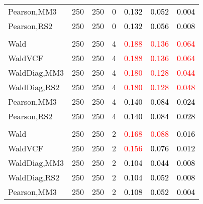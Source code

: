 \documentclass[
]{article}
\begin{document}
\begin{table}[H]
{\begin{tabular}[t]{lrrrrrr}
\hspace{1em}Pearson,MM3 & 250 & 250 & 0 & \textcolor{black}{0.132} & \textcolor{black}{0.052} & \textcolor{black}{0.004}\\
\hspace{1em}Pearson,RS2 & 250 & 250 & 0 & \textcolor{black}{0.132} & \textcolor{black}{0.056} & \textcolor{black}{0.008}\\
\addlinespace[0.3em]
\multicolumn{7}{l}{\textbf{1F 15V}}\\
\hspace{1em}Wald & 250 & 250 & 4 & \textcolor{red}{0.188} & \textcolor{red}{0.136} & \textcolor{red}{0.064}\\
\hspace{1em}WaldVCF & 250 & 250 & 4 & \textcolor{red}{0.188} & \textcolor{red}{0.136} & \textcolor{red}{0.064}\\
\hspace{1em}WaldDiag,MM3 & 250 & 250 & 4 & \textcolor{red}{0.180} & \textcolor{red}{0.128} & \textcolor{red}{0.044}\\
\hspace{1em}WaldDiag,RS2 & 250 & 250 & 4 & \textcolor{red}{0.180} & \textcolor{red}{0.128} & \textcolor{red}{0.048}\\
\hspace{1em}Pearson,MM3 & 250 & 250 & 4 & \textcolor{black}{0.140} & \textcolor{black}{0.084} & \textcolor{black}{0.024}\\
\hspace{1em}Pearson,RS2 & 250 & 250 & 4 & \textcolor{black}{0.140} & \textcolor{black}{0.084} & \textcolor{black}{0.028}\\
\addlinespace[0.3em]
\multicolumn{7}{l}{\textbf{2F 10V}}\\
\hspace{1em}Wald & 250 & 250 & 2 & \textcolor{red}{0.168} & \textcolor{red}{0.088} & \textcolor{black}{0.016}\\
\hspace{1em}WaldVCF & 250 & 250 & 2 & \textcolor{red}{0.156} & \textcolor{black}{0.076} & \textcolor{black}{0.012}\\
\hspace{1em}WaldDiag,MM3 & 250 & 250 & 2 & \textcolor{black}{0.104} & \textcolor{black}{0.044} & \textcolor{black}{0.008}\\
\hspace{1em}WaldDiag,RS2 & 250 & 250 & 2 & \textcolor{black}{0.104} & \textcolor{black}{0.052} & \textcolor{black}{0.008}\\
\hspace{1em}Pearson,MM3 & 250 & 250 & 2 & \textcolor{black}{0.108} & \textcolor{black}{0.052} & \textcolor{black}{0.004}\\

\end{tabular}}
\end{table}
\end{document}
